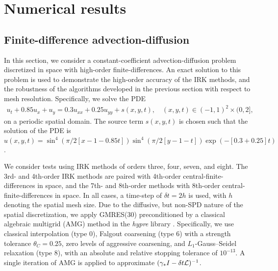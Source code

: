 \documentclass[review]{siamart}
\begin{document}
\section{Numerical results}\label{sec:numerics}

\subsection{Finite-difference advection-diffusion}\label{sec:numerics:fd}

In this section, we consider a constant-coefficient advection-diffusion problem
discretized in space with high-order finite-differences. An exact solution to
this problem is used to demonstrate the high-order accuracy of the IRK methods,
and the robustness of the algorithms developed in the previous section with
respect to mesh resolution. Specifically, we solve the PDE
%
\begin{align}
\label{eq:FD_ex} u_t + 0.85 u_x + u_y = 0.3 u_{xx} + 0.25 u_{yy} + s(x,y,t),
\quad (x,y,t) \in (-1,1)^2 \times (0,2],
\end{align}
%
on a periodic spatial domain. The source term $s(x,y,t)$ is chosen such that
the solution of the PDE is
$u(x,y,t)=\sin^4(\pi/2[x-1-0.85t]) \sin^4(\pi/2 [y-1-t]) \exp(-[0.3+0.25]t)$.

We consider tests using IRK methods of orders three, four, seven, and eight. The
3rd- and 4th-order IRK methods are paired with 4th-order
central-finite-differences in space, and the 7th- and 8th-order methods with
8th-order central-finite-differences in space. In all cases, a time-step of
$\delta t = 2 h$ is used, with $h$ denoting the spatial mesh size. Due to the
diffusive, but non-SPD nature of the spatial discretization, we apply GMRES(30)
preconditioned by a classical algebraic multigrid (AMG) method in the
\textit{hypre} library \cite{Falgout:2002vu}. Specifically, we
use classical interpolation (type 0), Falgout coarsening (type 6) with a strength
tolerance $\theta_C = 0.25$, zero levels of aggressive coarsening, and
$L_1$-Gauss--Seidel relaxation (type 8), with an absolute and relative stopping
tolerance of $10^{-13}$. A single iteration of AMG is applied to approximate
$(\gamma_* I - \delta t {\cal L})^{-1}$.
\end{document}
